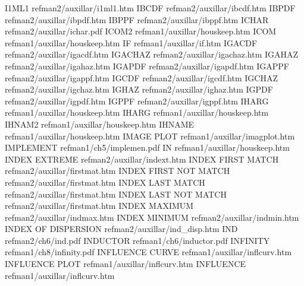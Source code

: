 I1ML1                                   refman2/auxillar/i1ml1.htm
IBCDF                                   refman2/auxillar/ibcdf.htm
IBPDF                                   refman2/auxillar/ibpdf.htm
IBPPF                                   refman2/auxillar/ibppf.htm
ICHAR                                   refman2/auxillar/ichar.pdf
ICOM2                                   refman1/auxillar/houskeep.htm
ICOM                                    refman1/auxillar/houskeep.htm
IF                                      refman1/auxillar/if.htm
IGACDF                                  refman2/auxillar/igacdf.htm
IGACHAZ                                 refman2/auxillar/igachaz.htm
IGAHAZ                                  refman2/auxillar/igahaz.htm
IGAPDF                                  refman2/auxillar/igapdf.htm
IGAPPF                                  refman2/auxillar/igappf.htm
IGCDF                                   refman2/auxillar/igcdf.htm
IGCHAZ                                  refman2/auxillar/igchaz.htm
IGHAZ                                   refman2/auxillar/ighaz.htm
IGPDF                                   refman2/auxillar/igpdf.htm
IGPPF                                   refman2/auxillar/igppf.htm
IHARG                                   refman1/auxillar/houskeep.htm
IHARG                                   refman1/auxillar/houskeep.htm
IHNAM2                                  refman1/auxillar/houskeep.htm
IHNAME                                  refman1/auxillar/houskeep.htm
IMAGE PLOT                              refman1/auxillar/imagplot.htm
IMPLEMENT                               refman1/ch5/implemen.pdf
IN                                      refman1/auxillar/houskeep.htm
INDEX EXTREME                           refman2/auxillar/indext.htm
INDEX FIRST MATCH                       refman2/auxillar/firstmat.htm
INDEX FIRST NOT MATCH                   refman2/auxillar/firstmat.htm
INDEX LAST MATCH                        refman2/auxillar/firstmat.htm
INDEX LAST NOT MATCH                    refman2/auxillar/firstmat.htm
INDEX MAXIMUM                           refman2/auxillar/indmax.htm
INDEX MINIMUM                           refman2/auxillar/indmin.htm
INDEX OF DISPERSION                     refman2/auxillar/ind_disp.htm
IND                                     refman2/ch6/ind.pdf
INDUCTOR                                refman1/ch6/inductor.pdf
INFINITY                                refman1/ch8/infinity.pdf
INFLUENCE CURVE                         refman1/auxillar/inflcurv.htm
INFLUENCE PLOT                          refman1/auxillar/inflcurv.htm
INFLUENCE                               refman1/auxillar/inflcurv.htm
